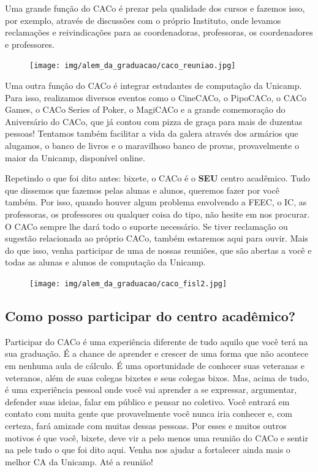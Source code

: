 Uma grande função do CACo é prezar pela qualidade dos cursos e fazemos isso,
por exemplo, através de discussões com o próprio Instituto, onde levamos
reclamações e reivindicações para as coordenadoras, professoras, os
coordenadores e professores.

\begin{figure}[H]
  \centering
  \texttt{[image: img/alem\_da\_graduacao/caco\_reuniao.jpg]}
\end{figure}

Uma outra função do CACo é integrar estudantes de computação da Unicamp. Para
isso, realizamos diversos eventos como o CineCACo, o PipoCACo, o CACo Games, o
CACo Series of Poker, o MagiCACo e a grande comemoração do Aniversário do CACo,
que já contou com pizza de graça para mais de duzentas pessoas! Tentamos também
facilitar a vida da galera através dos armários que alugamos, o banco de livros
e o maravilhoso banco de provas, provavelmente o maior da Unicamp, disponível
online.

Repetindo o que foi dito antes: bixete, o CACo é o \textbf{SEU} centro
acadêmico. Tudo que dissemos que fazemos pelas alunas e alunos, queremos fazer
por você também. Por isso, quando houver algum problema envolvendo a FEEC, o
IC, as professoras, os professores ou qualquer coisa do tipo, não hesite em nos
procurar. O CACo sempre lhe dará todo o suporte necessário. Se tiver reclamação
ou sugestão relacionada ao próprio CACo, também estaremos aqui para ouvir. Mais
do que isso, venha participar de uma de nossas reuniões, que são abertas a você
e todas as alunas e alunos de computação da Unicamp.

\begin{figure}[H]
  \centering
  \texttt{[image: img/alem\_da\_graduacao/caco\_fisl2.jpg]}
\end{figure}

\subsection{Como posso participar do centro acadêmico?}

Participar do CACo é uma experiência diferente de tudo aquilo que você terá na
sua graduação. É a chance de aprender e crescer de uma forma que não acontece
em nenhuma aula de cálculo. É uma oportunidade de conhecer suas veteranas e
veteranos, além de suas colegas bixetes e seus colegas bixos. Mas, acima de
tudo, é uma experiência pessoal onde você vai aprender a se expressar,
argumentar, defender suas ideias, falar em público e pensar no coletivo. Você
entrará em contato com muita gente que provavelmente você nunca iria conhecer
e, com certeza, fará amizade com muitas dessas pessoas. Por esses e muitos
outros motivos é que você, bixete, deve vir a pelo menos uma reunião do CACo e
sentir na pele tudo o que foi dito aqui. Venha nos ajudar a fortalecer ainda
mais o melhor CA da Unicamp. Até a reunião!

